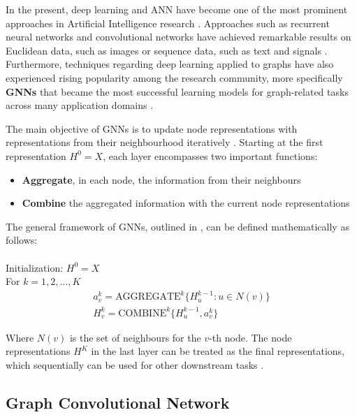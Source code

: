 In the present, deep learning and \ac{ANN} have become one of the most prominent approaches in Artificial Intelligence research \cite{cuiGraphRepresentationLearning2022}. Approaches such as recurrent neural networks and convolutional networks have achieved remarkable results on Euclidean data, such as images or sequence data, such as text and signals \cite{wuGraphNeuralNetworks2022a}. Furthermore, techniques regarding deep learning applied to graphs have also experienced rising popularity among the research community, more specifically \textbf{\acp{GNN}} that became the most successful learning models for graph-related tasks across many application domains \cite{cuiGraphRepresentationLearning2022, wuGraphNeuralNetworks2022a}. \par

The main objective of \acp{GNN} is to update node representations with representations from their neighbourhood iteratively \cite{tangGraphNeuralNetworks2022}. Starting at the first representation $H^0 = X$, each layer encompasses two important functions:
\begin{itemize}
	\item \textbf{Aggregate}, in each node, the information from their neighbours
	\item \textbf{Combine} the aggregated information with the current node representations
\end{itemize}

The general framework of \acp{GNN}, outlined in \cite{tangGraphNeuralNetworks2022}, can be defined mathematically as follows: \\ \\
Initialization: $H^0 = X$ \\
For $k = 1, 2, \dots, K$
\begin{gather*}
	a^k_v = \text{AGGREGATE}^k\{H^{k-1}_u : u \in N(v)\} \\
	H^k_v = \text{COMBINE}^k\{H^{k-1}_u, a^k_v\}       
\end{gather*}

Where $N(v)$ is the set of neighbours for the $v$-th node. The node representations $H^K$ in the last layer can be treated as the final representations, which sequentially can be used for other downstream tasks \cite{tangGraphNeuralNetworks2022}.


\subsection{Graph Convolutional Network}

